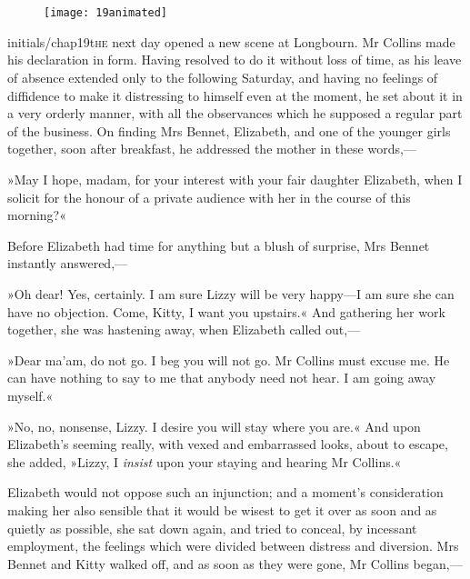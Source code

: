 \chapter[Chapter \thechapter]{}

\begin{figure}[t!]
\centering
\texttt{[image: 19animated]}
\end{figure}

\lettrine[lines=6,image=true]{initials/chap19t}{he}  next day opened a new scene at Longbourn. Mr Collins made his declaration in form. Having resolved to do it without loss of time, as his leave of absence extended only to the following Saturday, and having no feelings of diffidence to make it distressing to himself even at the moment, he set about it in a very orderly manner, with all the observances which he supposed a regular part of the business. On finding Mrs Bennet, Elizabeth, and one of the younger girls together, soon after breakfast, he addressed the mother in these words,—

»May I hope, madam, for your interest with your fair daughter Elizabeth, when I solicit for the honour of a private audience with her in the course of this morning?«

Before Elizabeth had time for anything but a blush of surprise, Mrs Bennet instantly answered,—

»Oh dear! Yes, certainly. I am sure Lizzy will be very happy—I am sure she can have no objection. Come, Kitty, I want you upstairs.« And gathering her work together, she was hastening away, when Elizabeth called out,—

»Dear ma'am, do not go. I beg you will not go. Mr Collins must excuse me. He can have nothing to say to me that anybody need not hear. I am going away myself.«

»No, no, nonsense, Lizzy. I desire you will stay where you are.« And upon Elizabeth's seeming really, with vexed and embarrassed looks, about to escape, she added, »Lizzy, I \textit{insist} upon your staying and hearing Mr Collins.«

Elizabeth would not oppose such an injunction; and a moment's consideration making her also sensible that it would be wisest to get it over as soon and as quietly as possible, she sat down again, and tried to conceal, by incessant employment, the feelings which were divided between distress and diversion. Mrs Bennet and Kitty walked off, and as soon as they were gone, Mr Collins began,—

